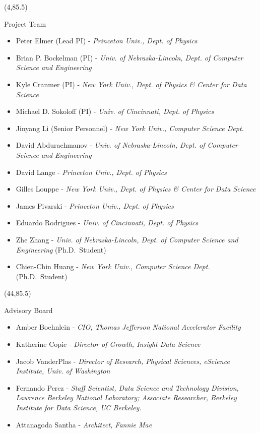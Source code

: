 \documentclass[final]{beamer}
\begin{document}
\begin{frame}{}
\begin{textblock}{38.0}(4,85.5)
\begin{block}{Project Team}
\begin{itemize}
\item Peter Elmer (Lead PI) - {\it Princeton Univ., Dept. of Physics}
\item Brian P. Bockelman (PI) - {\it Univ. of Nebraska-Lincoln, Dept. of Computer Science and Engineering}
\item Kyle Cranmer (PI) - {\it New York Univ., Dept. of Physics \& Center for Data Science}
\item Michael D. Sokoloff (PI) - {\it Univ. of Cincinnati, Dept. of Physics}
\item Jinyang Li (Senior Personnel) - {\it New York Univ., Computer Science Dept.}
\item David Abdurachmanov - {\it Univ. of Nebraska-Lincoln, Dept. of Computer Science and Engineering}
\item David Lange - {\it Princeton Univ., Dept. of Physics}
\item Gilles Louppe - {\it New York Univ., Dept. of Physics \& Center for Data Science}
\item James Pivarski - {\it Princeton Univ., Dept. of Physics}
\item Eduardo Rodrigues - {\it Univ. of Cincinnati, Dept. of Physics}
\item Zhe Zhang - {\it Univ. of Nebraska-Lincoln, Dept. of Computer Science and Engineering} (Ph.D.\ Student)
\item Chien-Chin Huang - {\it New York Univ., Computer Science Dept.} (Ph.D.\ Student) 
\end{itemize}
\end{block}
\end{textblock}


\begin{textblock}{38.0}(44,85.5)
\begin{block}{Advisory Board}
\begin{itemize}
\item Amber Boehnlein - {\it CIO, Thomas Jefferson National Accelerator Facility}
\item Katherine Copic - {\it Director of Growth, Insight Data Science}
\item Jacob VanderPlas - {\it Director of Research, Physical Sciences, eScience Institute, Univ. of Washington}
\item Fernando Perez - {\it Staff Scientist, Data Science and Technology Division, Lawrence Berkeley National Laboratory; Associate Researcher, Berkeley Institute for Data Science, UC Berkeley.}
\item Attanagoda Santha - {\it Architect, Fannie Mae}
\end{itemize}
\end{block}
\end{textblock}



\end{frame}
\end{document}
